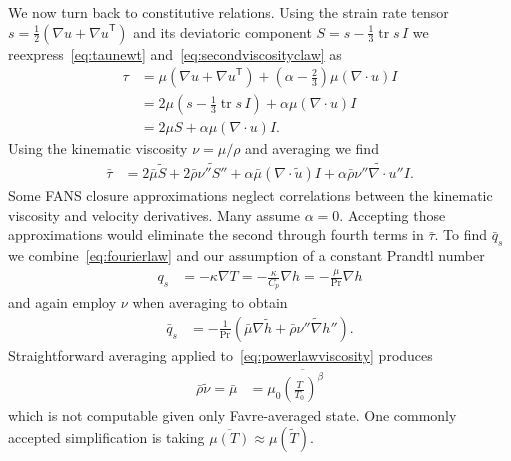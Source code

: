 \documentclass[letterpaper,11pt,nointlimits,reqno]{amsart}
\newcommand{\trans}[1]{{#1}^{\ensuremath{\mathsf{T}}}}
\newcommand{\Prandtl}[1][]{\ensuremath{\mbox{Pr}_{#1}}}
\DeclareMathOperator{\trace}{tr}
\begin{document}
We now turn back to constitutive relations.  Using the strain rate tensor
$s=\frac{1}{2}\left( \nabla{}u+\trans{\nabla{}u} \right)$ and its deviatoric
component $S=s-\frac{1}{3}\trace{s}\,I$ we reexpress~\eqref{eq:taunewt}
and~\eqref{eq:secondviscosityclaw} as
\begin{align}
  \tau
&= \mu \left( \nabla{}u+\trans{\nabla{}u} \right)
 + \left( \alpha - \frac{2}{3} \right) \mu \left(\nabla\cdot{}u\right) I
\\
&= 2 \mu \left( s - \frac{1}{3} \trace{s} \, I \right)
 + \alpha \mu \left( \nabla \cdot{} u \right) I
\\
&= 2 \mu{} S + \alpha \mu \left( \nabla\cdot{}u \right) I.
\end{align}
Using the kinematic viscosity $\nu = \mu / \rho$ and averaging we find
\begin{align}
   \bar{\tau}
&= 2 \bar{\mu}\tilde{S} + 2 \bar{\rho} \widetilde{\nu''S''}
  + \alpha \bar{\mu} \left(\nabla\cdot\tilde{u}\right) I
  + \alpha \bar{\rho} \widetilde{\nu''\nabla\cdot{}u''} I
.
\end{align}
Some FANS closure approximations neglect correlations between the kinematic
viscosity and velocity derivatives.  Many assume $\alpha=0$.  Accepting those
approximations would eliminate the second through fourth terms in $\bar{\tau}$.
To find $\bar{q}_s$ we combine~\eqref{eq:fourierlaw} and our assumption of a
constant Prandtl number
\begin{align}
  q_{s} &= - \kappa \nabla{} T
     = - \frac{\kappa}{C_p} \nabla{}h
     = - \frac{\mu}{\Prandtl} \nabla{}h
\end{align}
and again employ $\nu$ when averaging to obtain
\begin{align}
  \bar{q}_s
&= - \frac{1}{\Prandtl}\left(
                \bar{\mu}\nabla\tilde{h}
              + \bar{\rho} \widetilde{\nu''\nabla{}h''}
            \right)
.
\end{align}
Straightforward averaging applied to~\eqref{eq:powerlawviscosity} produces
\begin{align}
   \bar{\rho}\tilde{\nu}
 = \bar{\mu}
&= \mu_0 \overline{\left(\frac{T}{T_0}\right)^\beta}
\end{align}
which is not computable given only Favre-averaged state.  One commonly accepted
simplification is taking $\overline{\mu\left(T\right)} \approx
\mu\left(\tilde{T}\right)$.
\end{document}
